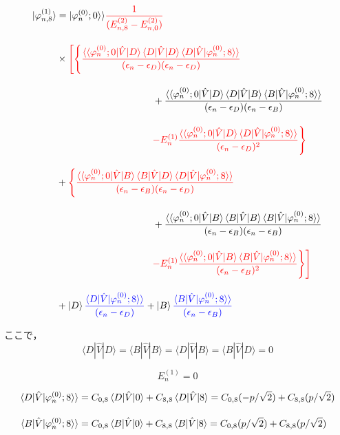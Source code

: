 \begin{align}
    \ket{\varphi_{n,8}^{(1)}}
    &=
    |\varphi^{(0)}_n;0\rangle\rangle
    \textcolor{red}{\frac{1}{(E^{(2)}_{n,8}-E^{(2)}_{n,0})}}\nn[10pt]
    &\times
    \textcolor{red}{\Biggl[\Biggl\{
    \frac{\langle\braket{\varphi^{(0)}_{n};0|\hat{V}|D}
    \langle{D|\hat{V}|D}\rangle
    \braket{D|\hat{V}|\varphi^{(0)}_n;8}\rangle}
    {(\epsilon_n-\epsilon_D)(\epsilon_n-\epsilon_D)}}\nn[10pt]
    &\hspace{100pt}
    +{\frac{\langle\braket{\varphi^{(0)}_{n};0|\hat{V}|D}
    \langle{D|\hat{V}|B}\rangle
    \braket{B|\hat{V}|\varphi^{(0)}_n;8}\rangle}
    {(\epsilon_n-\epsilon_D)(\epsilon_n-\epsilon_B)}}\nn[10pt]
    &\hspace{100pt}
    \textcolor{red}{-E^{(1)}_n
    \frac{\langle\braket{\varphi^{(0)}_{n};0|\hat{V}|D}
    \braket{D|\hat{V}|\varphi^{(0)}_n;8}\rangle}{(\epsilon_n-\epsilon_D)^2}
    \Biggr\}}
    \nn[10pt]
    &+\textcolor{red}{\Biggl\{
    \frac{\langle\braket{\varphi^{(0)}_{n};0|\hat{V}|B}
    \langle{B|\hat{V}|D}\rangle
    \braket{D|\hat{V}|\varphi^{(0)}_n;8}\rangle}
    {(\epsilon_n-\epsilon_B)(\epsilon_n-\epsilon_D)}}\nn[10pt]
    &\hspace{100pt}
    +{\frac{\langle\braket{\varphi^{(0)}_{n};0|\hat{V}|B}
    \langle{B|\hat{V}|B}\rangle
    \braket{B|\hat{V}|\varphi^{(0)}_n;8}\rangle}
    {(\epsilon_n-\epsilon_B)(\epsilon_n-\epsilon_B)}}\nn[10pt]
    &\hspace{100pt}
    \textcolor{red}{-E^{(1)}_n
    \frac{\langle\braket{\varphi^{(0)}_{n};0|\hat{V}|B}
    \braket{B|\hat{V}|\varphi^{(0)}_n;8}\rangle}{(\epsilon_n-\epsilon_B)^2}
    \Biggr\}\Biggr]}
    \nn[10pt]
    &+
    \ket{D}
    \textcolor{blue}{
    \frac{\braket{D|\hat{V}|\varphi^{(0)}_n;8}\rangle}{(\epsilon_n-\epsilon_D)}}
    +
    \ket{B}
    \textcolor{blue}{
    \frac{\braket{B|\hat{V}|\varphi^{(0)}_n;8}\rangle}{(\epsilon_n-\epsilon_B)}}
\end{align}

ここで，
\begin{equation}
    \langle{D|\hat{V}|D}\rangle
    =\langle{B|\hat{V}|B}\rangle
    =\langle{D|\hat{V}|B}\rangle
    =\langle{B|\hat{V}|D}\rangle=0
\end{equation}

\begin{equation}
    E^{(1)}_n = 0
\end{equation}

\begin{align}
    \braket{D|\hat{V}|\varphi^{(0)}_n;8}\rangle
    &=C_{0,8}\braket{D|\hat{V}|0} + C_{8,8}\braket{D|\hat{V}|8}
    =C_{0,8}(-p/\sqrt{2}) + C_{8,8} (p/\sqrt{2})\\[10pt]
    \braket{B|\hat{V}|\varphi^{(0)}_n;8}\rangle
    &=C_{0,8}\braket{B|\hat{V}|0} + C_{8,8}\braket{B|\hat{V}|8}
    =C_{0,8}(p/\sqrt{2}) + C_{8,8} (p/\sqrt{2})
\end{align}

